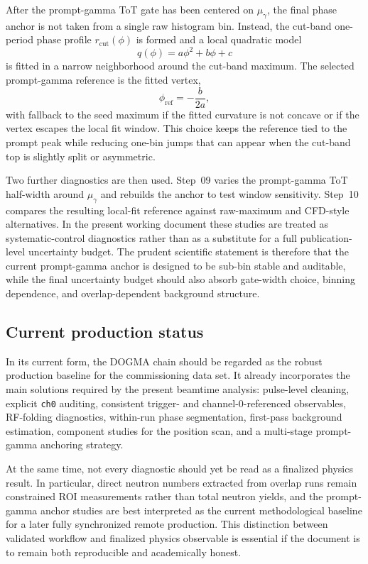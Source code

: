 After the prompt-gamma ToT gate has been centered on \(\mu_{\gamma}\), the final phase anchor is not taken from a single raw histogram bin. Instead, the cut-band one-period phase profile \(r_{\mathrm{cut}}(\phi)\) is formed and a local quadratic model
\begin{equation}
q(\phi) = a\phi^2 + b\phi + c
\end{equation}
is fitted in a narrow neighborhood around the cut-band maximum. The selected prompt-gamma reference is the fitted vertex,
\begin{equation}
\phi_{\mathrm{ref}} = -\frac{b}{2a},
\end{equation}
with fallback to the seed maximum if the fitted curvature is not concave or if the vertex escapes the local fit window. This choice keeps the reference tied to the prompt peak while reducing one-bin jumps that can appear when the cut-band top is slightly split or asymmetric.

Two further diagnostics are then used. Step~09 varies the prompt-gamma ToT half-width around \(\mu_{\gamma}\) and rebuilds the anchor to test window sensitivity. Step~10 compares the resulting local-fit reference against raw-maximum and CFD-style alternatives. In the present working document these studies are treated as systematic-control diagnostics rather than as a substitute for a full publication-level uncertainty budget. The prudent scientific statement is therefore that the current prompt-gamma anchor is designed to be sub-bin stable and auditable, while the final uncertainty budget should also absorb gate-width choice, binning dependence, and overlap-dependent background structure.

\subsection{Current production status}

In its current form, the DOGMA chain should be regarded as the robust production baseline for the commissioning data set. It already incorporates the main solutions required by the present beamtime analysis: pulse-level cleaning, explicit \texttt{ch0} auditing, consistent trigger- and channel-0-referenced observables, RF-folding diagnostics, within-run phase segmentation, first-pass background estimation, component studies for the position scan, and a multi-stage prompt-gamma anchoring strategy.

At the same time, not every diagnostic should yet be read as a finalized physics result. In particular, direct neutron numbers extracted from overlap runs remain constrained ROI measurements rather than total neutron yields, and the prompt-gamma anchor studies are best interpreted as the current methodological baseline for a later fully synchronized remote production. This distinction between validated workflow and finalized physics observable is essential if the document is to remain both reproducible and academically honest.

